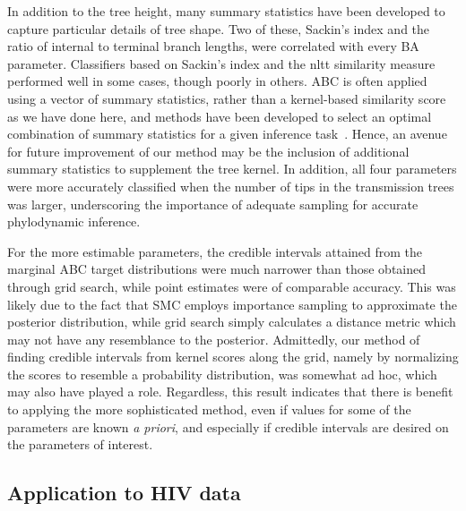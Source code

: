 In addition to the tree height, many summary statistics have been developed to
capture particular details of tree shape. Two of these, Sackin's index and the
ratio of internal to terminal branch lengths, were correlated with every
\gls{BA} parameter. Classifiers based on Sackin's index and the \gls{nltt}
similarity measure performed well in some cases, though poorly in others.
\gls{ABC} is often applied using a vector of summary statistics, rather than a
kernel-based similarity score as we have done here, and methods have been
developed to select an optimal combination of summary statistics for a given
inference task~\autocite{fearnhead2012constructing}. Hence, an avenue for
future improvement of our method may be the inclusion of additional summary
statistics to supplement the tree kernel. In addition, all four parameters were
more accurately classified when the number of tips in the transmission trees
was larger, underscoring the importance of adequate sampling for accurate
phylodynamic inference.

For the more estimable parameters, the credible intervals attained from the
marginal \gls{ABC} target distributions were much narrower than those obtained
through grid search, while point estimates were of comparable accuracy. This
was likely due to the fact that \gls{SMC} employs importance sampling to
approximate the posterior distribution, while grid search simply calculates a
distance metric which may not have any resemblance to the posterior.
Admittedly, our method of finding credible intervals from kernel scores along
the grid, namely by normalizing the scores to resemble a probability
distribution, was somewhat ad hoc, which may also have played a role.
Regardless, this result indicates that there is benefit to applying the more
sophisticated method, even if values for some of the parameters are known
\textit{a priori}, and especially if credible intervals are desired on the
parameters of interest.

\subsection{Application to HIV data}

